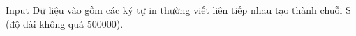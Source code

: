 Input
Dữ liệu vào gồm các ký tự in thường viết liên tiếp nhau tạo thành chuỗi S (độ dài không quá 500000).